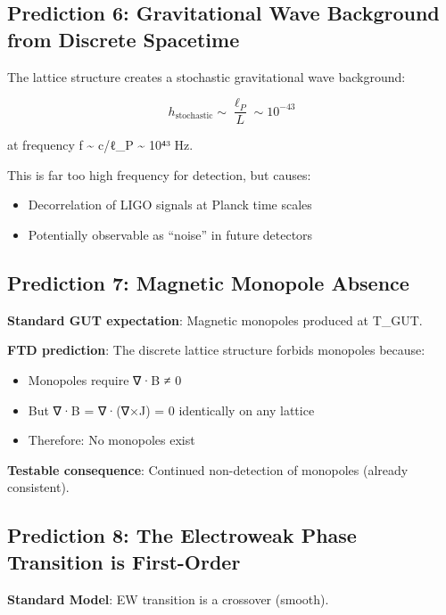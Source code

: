 \documentclass[
  11pt,
  letterpaper,
  twoside,
  openany]{book}
\makeatletter
\providecommand{\tightlist}{%
  \setlength{\itemsep}{0pt}\setlength{\parskip}{0pt}}
\let\orig@subsection\subsection
\renewcommand{\subsection}{\needspace{6\baselineskip}\orig@subsection}
\makeatother
\begin{document}
\subsection{Prediction 6: Gravitational Wave Background from Discrete
Spacetime}\label{prediction-6-gravitational-wave-background-from-discrete-spacetime}

The lattice structure creates a stochastic gravitational wave
background:

\[h_{\text{stochastic}} \sim \frac{\ell_P}{L} \sim 10^{-43}\]

at frequency f \textasciitilde{} c/ℓ\_P \textasciitilde{} 10⁴³ Hz.

This is far too high frequency for detection, but causes:

\begin{itemize}
\tightlist
\item
  Decorrelation of LIGO signals at Planck time scales
\item
  Potentially observable as ``noise'' in future detectors
\end{itemize}

\subsection{Prediction 7: Magnetic Monopole
Absence}\label{prediction-7-magnetic-monopole-absence}

\textbf{Standard GUT expectation}: Magnetic monopoles produced at
T\_GUT.

\textbf{FTD prediction}: The discrete lattice structure forbids
monopoles because:

\begin{itemize}
\tightlist
\item
  Monopoles require ∇·B ≠ 0
\item
  But ∇·B = ∇·(∇×J) = 0 identically on any lattice
\item
  Therefore: No monopoles exist
\end{itemize}

\textbf{Testable consequence}: Continued non-detection of monopoles
(already consistent).

\subsection{Prediction 8: The Electroweak Phase Transition is
First-Order}\label{prediction-8-the-electroweak-phase-transition-is-first-order}

\textbf{Standard Model}: EW transition is a crossover (smooth).
\end{document}
